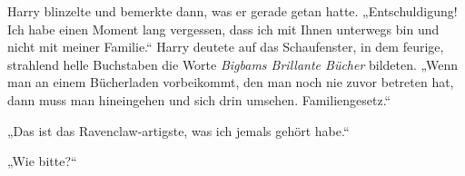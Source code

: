 Harry blinzelte und bemerkte dann, was er gerade getan hatte. „Entschuldigung! Ich habe einen Moment lang vergessen, dass ich mit Ihnen unterwegs bin und nicht mit meiner Familie.“ Harry deutete auf das Schaufenster, in dem feurige, strahlend helle Buchstaben die Worte \emph{Bigbams Brillante Bücher} bildeten. „Wenn man an einem Bücherladen vorbeikommt, den man noch nie zuvor betreten hat, dann muss man hineingehen und sich drin umsehen. Familiengesetz.“

„Das ist das Ravenclaw-artigste, was ich jemals gehört habe.“

„Wie bitte?“

